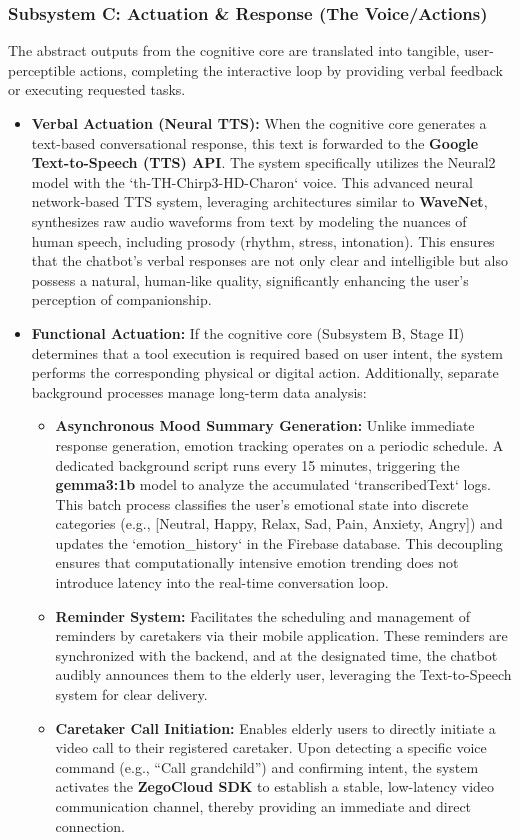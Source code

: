 \subsubsection{Subsystem C: Actuation \& Response (The Voice/Actions)}
The abstract outputs from the cognitive core are translated into tangible, user-perceptible actions, completing the interactive loop by providing verbal feedback or executing requested tasks.

\begin{itemize}
    \item \textbf{Verbal Actuation (Neural TTS):} When the cognitive core generates a text-based conversational response, this text is forwarded to the \textbf{Google Text-to-Speech (TTS) API}. The system specifically utilizes the Neural2 model with the `th-TH-Chirp3-HD-Charon` voice. This advanced neural network-based TTS system, leveraging architectures similar to \textbf{WaveNet}, synthesizes raw audio waveforms from text by modeling the nuances of human speech, including prosody (rhythm, stress, intonation). This ensures that the chatbot's verbal responses are not only clear and intelligible but also possess a natural, human-like quality, significantly enhancing the user's perception of companionship.
    \item \textbf{Functional Actuation:} If the cognitive core (Subsystem B, Stage II) determines that a tool execution is required based on user intent, the system performs the corresponding physical or digital action. Additionally, separate background processes manage long-term data analysis:
    \begin{itemize}
        \item \textbf{Asynchronous Mood Summary Generation:} Unlike immediate response generation, emotion tracking operates on a periodic schedule. A dedicated background script runs every 15 minutes, triggering the \textbf{gemma3:1b} model to analyze the accumulated `transcribedText` logs. This batch process classifies the user's emotional state into discrete categories (e.g., [Neutral, Happy, Relax, Sad, Pain, Anxiety, Angry]) and updates the `emotion\_history` in the Firebase database. This decoupling ensures that computationally intensive emotion trending does not introduce latency into the real-time conversation loop.
        \item \textbf{Reminder System:} Facilitates the scheduling and management of reminders by caretakers via their mobile application. These reminders are synchronized with the backend, and at the designated time, the chatbot audibly announces them to the elderly user, leveraging the Text-to-Speech system for clear delivery.
        \item \textbf{Caretaker Call Initiation:} Enables elderly users to directly initiate a video call to their registered caretaker. Upon detecting a specific voice command (e.g., “Call grandchild”) and confirming intent, the system activates the \textbf{ZegoCloud SDK} to establish a stable, low-latency video communication channel, thereby providing an immediate and direct connection.
    \end{itemize}
\end{itemize}

